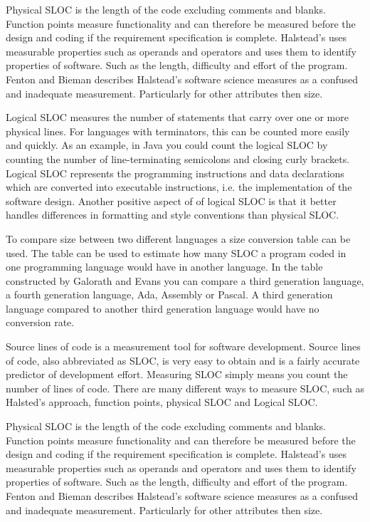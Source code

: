 Physical SLOC is the length of the code excluding comments and blanks. Function points measure functionality and can therefore be measured before the design and coding if the requirement specification is complete\cite[p.~187]{galorath2006}. Halstead’s uses measurable properties such as operands and operators and uses them to identify properties of software. Such as the length, difficulty and effort of the program. Fenton and Bieman describes Halstead’s software science measures as a confused and inadequate measurement. Particularly for other attributes then size\cite[p.~345]{fenton2015}.

Logical SLOC measures the number of statements that carry over one or more physical lines.  For languages with terminators, this can be counted more easily and quickly. As an example, in Java you could count the logical SLOC by counting the number of line-terminating semicolons and closing curly brackets. Logical SLOC represents the programming instructions and data declarations which are converted into executable instructions, i.e. the implementation of the software design. Another positive aspect of of logical SLOC is that it better handles differences in formatting and style conventions than physical SLOC\cite[p.~155]{galorath2006}.

To compare size between two different languages a size conversion table can be used. The table can be used to estimate how many SLOC a program coded in one programming language would have in another language. In the table constructed by Galorath and Evans you can compare a third generation language, a fourth generation language, Ada, Assembly or Pascal\cite[p.~163]{galorath2006}. A third generation language compared to another third generation language would have no conversion rate. 

Source lines of code is a measurement tool for software development. Source lines of code, also abbreviated as SLOC, is very easy to obtain and is a fairly accurate predictor of development effort\cite[p.~63]{galorath2006}. Measuring SLOC simply means you count the number of lines of code. There are many different ways to measure SLOC, such as Halsted’s approach, function points, physical SLOC and Logical SLOC. 

Physical SLOC is the length of the code excluding comments and blanks. Function points measure functionality and can therefore be measured before the design and coding if the requirement specification is complete\cite[p.~187]{galorath2006}. Halstead’s uses measurable properties such as operands and operators and uses them to identify properties of software. Such as the length, difficulty and effort of the program. Fenton and Bieman describes Halstead’s software science measures as a confused and inadequate measurement. Particularly for other attributes then size\cite[p.~345]{fenton2015}.

